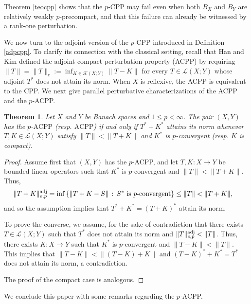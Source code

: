 \documentclass[12 pt]{article}%
\newtheorem{theorem}{Theorem}[section]
\newtheorem{final remark}[theorem]{Final Remark}
\newcommand{\norma}[1]{\| #1 \|}
\newcommand{\conj}[2]{\left \{ {#1} \, : \, {#2} \right \}}
\begin{document}
Theorem \ref{teocpp} shows that the $p$-$\mathrm{CPP}$ may fail even when both $B_X$ and $B_Y$ are relatively weakly $p$-precompact, and that this failure can already be witnessed by a rank-one perturbation. 


We now turn to the adjoint version of the $p$-$\mathrm{CPP}$ introduced in Definition \ref{adpcpp}. To clarify its connection with the classical setting, recall that Han and Kim \cite{han} defined the adjoint compact perturbation property (ACPP) by requiring $\norma{T} = \norma{T}_e := \displaystyle \inf_{K \in \mathcal{K}(X; Y)} \norma{T-K}$ for every $T \in \mathcal{L}(X; Y)$ whose adjoint $T^*$ does not attain its norm. When $X$ is reflexive, the ACPP is equivalent to the CPP. We next give parallel perturbative characterizations of the ACPP and the $p$-ACPP.

\begin{theorem} \label{acppchar1}
Let $X$ and $Y$ be Banach spaces and $1 \leq p < \infty$. The pair $(X, Y)$ has the  $p$-$\mathrm{ACPP}$ (resp. $\mathrm{ACPP}$) if and only if $T^* + K^*$ attains its norm whenever $T, K \in \mathcal{L}(X; Y)$ satisfy $\norma{T} < \norma{T+K}$ and $K^*$ is $p$-convergent (resp. $K$ is compact). 
\end{theorem}


\begin{proof}
    Assume first that $(X, Y)$ has the $p$-ACPP, and let $T, K: X \to Y$ be bounded linear operators such that $K^*$ is $p$-convergent and $\norma{T} < \norma{T+K}$. Thus, 
    \begin{align*}
        \norma{T+K}_{e,p}^{\rm adj} & = \inf \conj{\norma{T+K-S}}{S^* \text{ is $p$-convergent}} \leq \norma{T} < \norma{T+K},
    \end{align*}
    and so the assumption implies that $T^* + K^* = (T+K)^*$ attain its norm. 

    
    To prove the converse, we assume, for the sake of contradiction that there exists $T \in \mathcal{L}(X; Y)$ such that $T^*$ does not attain its norm and $\norma{T}_{e,p}^{\rm adj} < \norma{T}$. Thus, there exists $K: X \to Y$ such that $K^*$ is $p$-convergent and $\norma{T-K} < \norma{T}$. This implies that
    $  \norma{T-K} < \norma{(T-K) + K}   $
    and $(T-K)^* + K^* = T^*$ does not attain its norm, a contradiction.


    The proof of the compact case is analogous. 
\end{proof}


We conclude this paper with some remarks regarding the $p$-ACPP.
\end{document}
